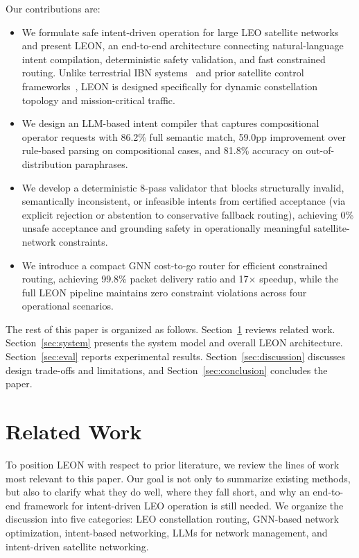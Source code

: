 \documentclass[10pt, conference, letterpaper]{IEEEtran}
\begin{document}
Our contributions are:
\begin{itemize}[leftmargin=*]
\item We formulate safe intent-driven operation for large LEO
satellite networks and present LEON, an end-to-end architecture
connecting natural-language intent compilation, deterministic safety
validation, and fast constrained routing. Unlike terrestrial IBN
systems~\cite{ibn_survey,ibn_framework} and prior satellite control
frameworks~\cite{satellite_sdn_survey,leo_routing_survey}, LEON is
designed specifically for dynamic constellation topology and
mission-critical traffic.
\item We design an LLM-based intent compiler that captures
compositional operator requests with 86.2\% full semantic match,
59.0pp improvement over rule-based parsing on compositional cases,
and 81.8\% accuracy on out-of-distribution paraphrases.
\item We develop a deterministic 8-pass validator that blocks
structurally invalid, semantically inconsistent, or infeasible
intents from certified acceptance (via explicit rejection or
abstention to conservative fallback routing), achieving 0\% unsafe acceptance and
grounding safety in operationally meaningful satellite-network
constraints.
\item We introduce a compact GNN cost-to-go router for efficient
constrained routing, achieving 99.8\% packet delivery ratio and
17$\times$ speedup, while the full LEON pipeline maintains zero
constraint violations across four operational scenarios.
\end{itemize}

The rest of this paper is organized as follows.
Section~\ref{sec:related} reviews related work.
Section~\ref{sec:system} presents the system model and overall LEON
architecture. Section~\ref{sec:eval} reports experimental
results. Section~\ref{sec:discussion} discusses design trade-offs
and limitations, and Section~\ref{sec:conclusion} concludes the paper.

\section{Related Work}
\label{sec:related}

To position LEON with respect to prior literature, we review the
lines of work most relevant to this paper. Our goal is not only to
summarize existing methods, but also to clarify what they do well,
where they fall short, and why an end-to-end framework for
intent-driven LEO operation is still needed. We organize the
discussion into five categories: LEO constellation routing, GNN-based
network optimization, intent-based networking, LLMs for network
management, and intent-driven satellite networking.
\end{document}
